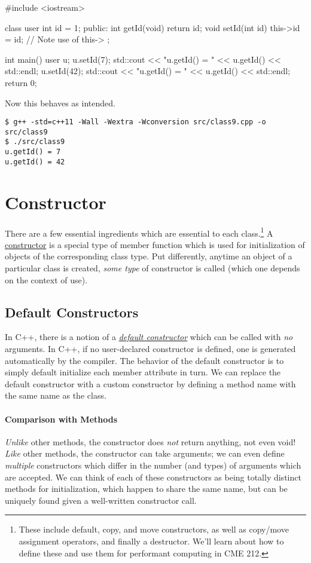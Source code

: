 \documentclass[12pt,letterpaper,twoside]{article}
\begin{document}
\begin{cpp}
#include <iostream>

class user {
  int id = 1;
 public:
  int getId(void) { return id; }
  void setId(int id) { this->id = id; }  // Note use of this->
};

int main() {
  user u;
  u.setId(7);
  std::cout << "u.getId() = " << u.getId() << std::endl;
  u.setId(42);
  std::cout << "u.getId() = " << u.getId() << std::endl;
  return 0;
}
\end{cpp}

Now this behaves as intended.
\begin{verbatim}
$ g++ -std=c++11 -Wall -Wextra -Wconversion src/class9.cpp -o src/class9
$ ./src/class9
u.getId() = 7
u.getId() = 42
\end{verbatim}

\section{Constructor} There are a few essential ingredients which are 
essential to each class.\footnote{These include 
  default, copy, and move constructors, as well as copy/move 
  assignment operators, and finally a destructor. We'll learn about how 
  to define these and use them for performant computing in CME 212.}
A \href{https://en.cppreference.com/w/cpp/language/initializer_list}
{constructor} is a special type of member function which is used for 
initialization of objects of the corresponding class type. Put differently,
anytime an object of a particular class is created, \emph{some type} of 
constructor is called (which one depends on the context of use). 

\subsection{Default Constructors}
In C++, there
is a notion of a 
\href{https://en.cppreference.com/w/cpp/language/default_constructor}
{\emph{default constructor}} which can be called with \emph{no} arguments.
In C++, if no user-declared constructor is defined, one is generated 
automatically by the compiler. The behavior of the default constructor
is to simply default initialize each member attribute in turn.
We can replace the default constructor with a custom constructor by
defining a method name with the same name as the class.

\paragraph{Comparison with Methods}
\emph{Unlike} other methods, the constructor 
does \emph{not} return anything, not even void!
\emph{Like}
 other methods, the constructor can take arguments; we can even define
\emph{multiple} constructors which differ in the number (and types) of arguments
which are accepted. We can think of each of these constructors as being totally distinct methods for initialization, which happen to share the same name, but
can be uniquely found given a well-written constructor call.
\end{document}

